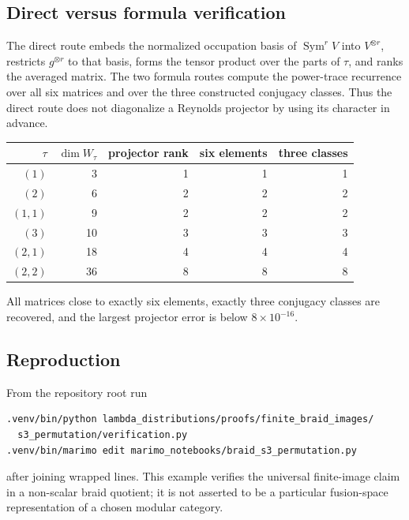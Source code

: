\documentclass[10pt]{article}
\begin{document}
\subsection{Direct versus formula verification}
The direct route embeds the normalized occupation basis of
$\operatorname{Sym}^rV$ into $V^{\otimes r}$, restricts $g^{\otimes r}$
to that basis, forms the tensor product over the parts of $\tau$, and ranks
the averaged matrix.  The two formula routes compute the power-trace
recurrence over all six matrices and over the three constructed conjugacy
classes.  Thus the direct route does not diagonalize a Reynolds projector by
using its character in advance.

\begin{center}
\begin{tabular}{@{}rrrrr@{}}\toprule
$\tau$&$\dim W_\tau$&projector rank&six elements&three classes\\\midrule
$(1)$&3&1&1&1\\
$(2)$&6&2&2&2\\
$(1,1)$&9&2&2&2\\
$(3)$&10&3&3&3\\
$(2,1)$&18&4&4&4\\
$(2,2)$&36&8&8&8\\\bottomrule
\end{tabular}
\end{center}
All matrices close to exactly six elements, exactly three conjugacy classes
are recovered, and the largest projector error is below $8\times10^{-16}$.

\subsection{Reproduction}
From the repository root run
\begin{verbatim}
.venv/bin/python lambda_distributions/proofs/finite_braid_images/
  s3_permutation/verification.py
.venv/bin/marimo edit marimo_notebooks/braid_s3_permutation.py
\end{verbatim}
after joining wrapped lines.  This example verifies the universal finite-image
claim in a non-scalar braid quotient; it is not asserted to be a particular
fusion-space representation of a chosen modular category.
\endgroup


\clearpage
\end{document}
